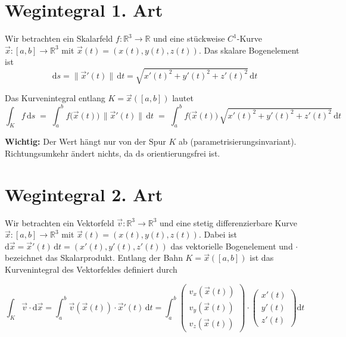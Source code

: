 \documentclass[a4paper,11pt,oneside,open=any,parskip=half, DIV=15]{scrreprt}
\begin{document}
\section{Wegintegral 1. Art}

   Wir betrachten ein Skalarfeld \(f:\mathbb{R}^3\to\mathbb{R}\) und eine stückweise \(C^1\)-Kurve
   \(\vec{x}:[a,b]\to\mathbb{R}^3\) mit \(\vec{x}(t)=(x(t),y(t),z(t))\).
      Das skalare Bogenelement ist
   \[
      \mathrm{d}s=\lVert \vec{x}'(t)\rVert\,\mathrm{d}t
      = \sqrt{x'(t)^2+y'(t)^2+z'(t)^2}\,\mathrm{d}t
   \]


   \begin{importantbox}
      Das Kurvenintegral entlang \(K = \vec x([a,b])\) lautet
      \[
         \int_{K} f\,\mathrm{d}s
         \;=\; \int_{a}^{b} f\!\bigl(\vec{x}(t)\bigr)\,\lVert \vec{x}'(t)\rVert\,\mathrm{d}t
         \;=\; \int_{a}^{b} f\!\bigl(\vec{x}(t)\bigr)\, \sqrt{x'(t)^2+y'(t)^2+z'(t)^2}\,\mathrm{d}t
      \]
   \end{importantbox}

   \textbf{Wichtig:} Der Wert hängt nur von der Spur \(K\) ab (parametrisierungsinvariant).
   Richtungsumkehr ändert nichts, da \(\mathrm{d}s\) orientierungsfrei ist.


\section{Wegintegral 2. Art}

   Wir betrachten ein Vektorfeld \(\vec{v} : \mathbb{R}^3 \to \mathbb{R}^3\) und eine stetig differenzierbare Kurve \(\vec{x} : [a,b] \to \mathbb{R}^3\) mit \(\vec{x}(t) = (x(t), y(t), z(t))\). Dabei ist \(\mathrm{d}\vec{x} = \vec{x}'(t) \, \mathrm{d}t = (x'(t), y'(t), z'(t))\) das vektorielle Bogenelement und \(\cdot\) bezeichnet das Skalarprodukt. Entlang der Bahn \(K = \vec{x}([a,b])\) ist das Kurvenintegral des Vektorfeldes definiert durch
   \begin{importantbox}
   \[
      \int_K \vec{v} \cdot \mathrm{d}\vec{x} = \int_a^b \vec{v}(\vec{x}(t)) \cdot \vec{x}'(t) \, \mathrm{d}t = \int_a^b \begin{pmatrix} v_x(\vec{x}(t)) \\ v_y(\vec{x}(t)) \\ v_z(\vec{x}(t)) \end{pmatrix} \cdot \begin{pmatrix} x'(t) \\ y'(t) \\ z'(t) \end{pmatrix} \mathrm{d}t
   \]
   \end{importantbox}
\end{document}

